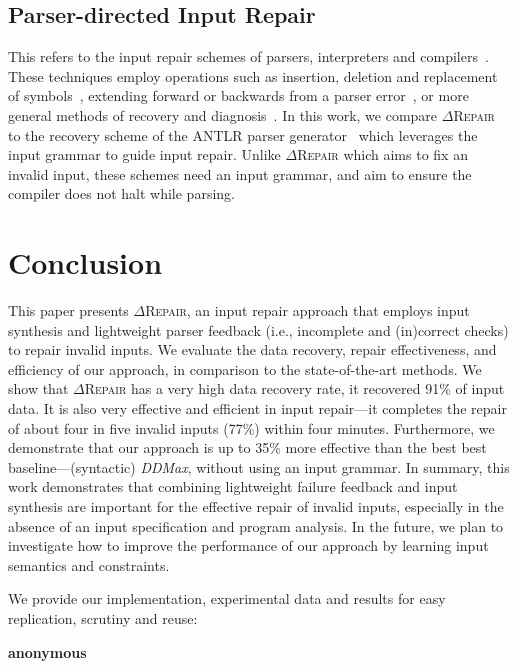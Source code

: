 \documentclass[acmsmall,screen,review,anonymous]{acmart}
\newcommand{\approach}{\textsc{$\Delta$Repair}\xspace}
\newcommand{\ddmax}{\textit{DDMax}\xspace}
\begin{document}
\subsection{Parser-directed Input Repair} %
This refers to the input repair schemes of parsers, interpreters and compilers~\cite{parr2011ll, diekmann2020dont, aho1972minimum, hammond1984survey, backhouse1979syntax}. 
These techniques employ operations such as insertion, deletion and replacement of symbols~\cite{anderson1981locally, cerecke2003locally, anderson1983assessment}, extending forward or backwards from a parser error~\cite{burke1982practical, mauney1982forward}, or more general methods of recovery and diagnosis~\cite{krawczyk1980error, aho1972minimum}. 
In this work, we compare \approach to the recovery scheme of the ANTLR parser generator~\cite{parr2011ll} which leverages the input grammar to guide input repair. %
Unlike \approach which aims to fix an invalid input, these schemes need an input grammar, and aim to ensure the compiler does not halt while parsing. 





\section{Conclusion}
\label{sec:conclusion}
This paper presents \approach, an input repair approach that employs input synthesis and lightweight parser feedback (i.e., incomplete and (in)correct checks) to repair invalid inputs. 
We evaluate the data recovery, repair effectiveness, and efficiency of our approach, in comparison to the state-of-the-art methods. We show that \approach has a very high data recovery rate, it recovered 91\% of input data. 
It is also very effective and efficient in input repair---it completes the repair of about four in five invalid inputs (77\%) within four minutes. Furthermore, we demonstrate that our approach is up to 35\% more effective than the best 
best baseline---(syntactic) \ddmax, without using an input grammar. In summary, this work demonstrates that combining lightweight failure feedback and input synthesis are important for the effective repair of invalid inputs, especially in the absence of an input specification 
and program analysis.
In the future, we plan to investigate how to improve the performance of our approach by learning input semantics and constraints.

We provide our implementation, experimental data and results for easy replication, scrutiny and reuse:


 \begin{center}
   \textbf{anonymous} %
 \end{center}









\end{document}
